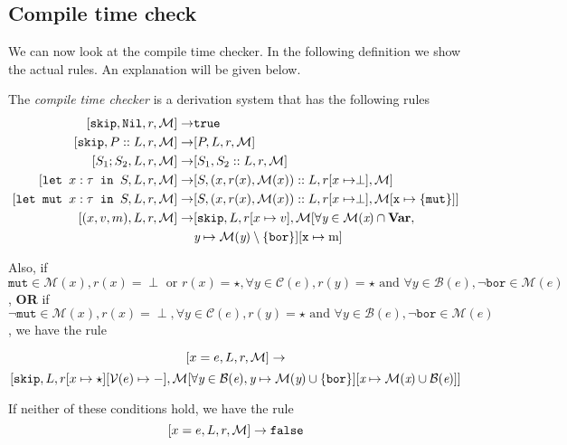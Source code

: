 \subsection{Compile time check}

We can now look at the compile time checker. In the following definition we show the actual rules. An explanation will be given below. 

\begin{definition}
\label{compiletimecheckerb}
The \emph{compile time checker} is a derivation system that has the following rules
\begin{align*}
\ccb{\texttt{skip}}{\texttt{Nil}}{r}{M} \to & \texttt{true}  \\
\ccb{\texttt{skip}}{P::L}{r}{M}       \to & \ccb{P}{L}{r}{M}  \\
\ccb{S_1; S_2}{L}{r}{M}                 \to & \ccb{S_1}{S_2::L}{r}{M}  \\
\ccb{\letm{x}{S}}{L}{r}{M}  \to & \ccb{S}{(x,r(x),\mathcal{M}(x))::L}{r[x\mapsto \perp]}{M} \\
\ccb{\letmut{x}{S}}{L}{r}{M}  \to & \ccb{S}{(x,r(x),\mathcal{M}(x))::L}{r[x\mapsto \perp]}{M[\texttt{x}\mapsto\{\texttt{mut}\}]} \\
\ccb{(x,v,m)}{L}{r}{M}                     \to & [\texttt{skip},L,r[x \mapsto v],\mathcal{M}[\forall \textit{y} \in \mathcal{M}(\textit{x})\cap\textbf{Var}, \\ & \textit{y} \mapsto \mathcal{M}(\textit{y}) \setminus \{\texttt{bor}\}][\texttt{x} \mapsto \textrm{m}] 
\end{align*}

Also, if $\texttt{mut} \in \mathcal{M}(x), r(x) = \perp \textrm{ or } r(x) = \star, \forall y \in \mathcal{C}(e), r(y) = \star \textrm{ and } \forall y \in \mathcal{B}(e), \neg \texttt{bor} \in \mathcal{M}(e)$, \textbf{OR} if $\neg \texttt{mut} \in \mathcal{M}(x), r(x) = \perp, \forall y \in \mathcal{C}(e), r(y) = \star \textrm{ and } \forall y \in \mathcal{B}(e), \neg \texttt{bor} \in \mathcal{M}(e)$, we have the rule

$$[ x=e, L, r, \mathcal{M} ]\to$$ 
$$[ \texttt{skip}, L, r[x\mapsto \star][\mathcal{V}(e) \mapsto -], \mathcal{M[\forall \textit{y} \in B(\textit{e}), \textit{y}\mapsto M(\textit{y})\cup \{\texttt{bor} \} ][\textit{x} \mapsto M(\textit{x}) \cup B(\textit{e})]} ]$$

If neither of these conditions hold, we have the rule 
$$[ x=e, L, r, \mathcal{M} ] \to \texttt{false}$$
\end{definition}

